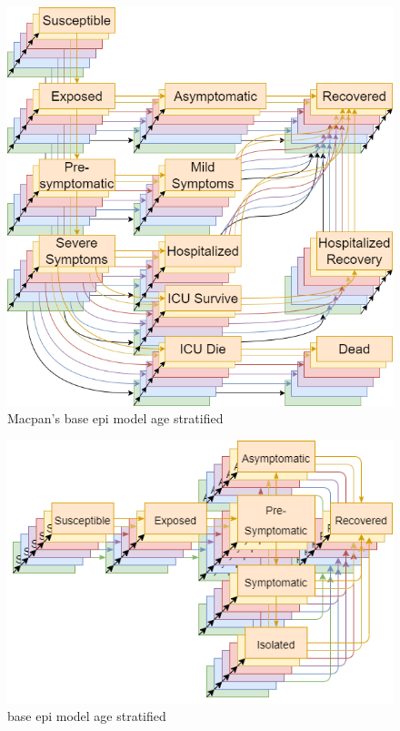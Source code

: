 \begin{appendices}
\begin{figure}
    \centering
    \includegraphics[width=\textwidth]{images/macpan_base_w_age.png}
    \caption{Macpan's base epi model age stratified}
    \label{fig:ageified_macpan_epi}
\end{figure}

\begin{figure}
    \centering
    \includegraphics[width=\textwidth]{images/fieldshumphery_age.png}
    \caption{\cite{fields2021age} base epi model age stratified}
    \label{fig:ageified_fh_epi}
\end{figure}

\FloatBarrier

\end{appendices}